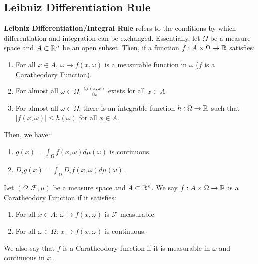\subsection{Leibniz Differentiation Rule}
\label{sec:leib_diff_rule}

\textbf{Leibniz Differentiation/Integral Rule} refers to the conditions by which differentiation and integration can be exchanged. Essentially, let $\Omega$ be a measure space and $A\subset\mathbb{R}^n$ be an open subset. Then, if a function $f:A \times \Omega \to \mathbb{R}$ satisfies:
\begin{enumerate}
	\item For all $x\in A$, $\omega\mapsto f(x, \omega)$ is a measurable function in $\omega$ ($f$ is a \underline{Caratheodory Function}).	
	\item For almost all $\omega\in\Omega$, $\frac{\partial f(x, \omega)}{\partial x}$ exists for all $x\in A$.
	\item For almost all $\omega\in\Omega$, there is an integrable function $h:\Omega\to\mathbb{R}$ such that $|f(x, \omega)|\le h(\omega)$ for all $x\in A$.
\end{enumerate} 

\noindent Then, we have:
\begin{enumerate}
	\item $g(x) = \int_\Omega f(x, \omega)d\mu(\omega)$ is continuous.
	\item $D_i g(x) = \int_\Omega D_i f(x, \omega)d\mu(\omega)$.
\end{enumerate} 


\begin{definition}
	Let $(\Omega, \mathcal{F}, \mu)$ be a measure space and $A\subset\mathbb{R}^n$. We say $f: A \times \Omega \to \mathbb{R}$ is a Caratheodory Function if it satisfies:
	\begin{enumerate}
		\item For all $x\in A$: $\omega\mapsto f(x, \omega)$ is $\mathcal{F}$-measurable.	
		\item For all $\omega\in\Omega$: $x\mapsto f(x, \omega)$ is continuous.
	\end{enumerate}

	\noindent We also say that $f$ is a Caratheodory function if it is measurable in $\omega$ and continuous in $x$.
\end{definition} 

